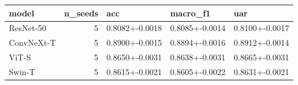 \begin{tabular}{lrlll}
\toprule
model & n_seeds & acc & macro_f1 & uar \\
\midrule
ResNet-50 & 5 & 0.8082+-0.0018 & 0.8085+-0.0014 & 0.8100+-0.0017 \\
ConvNeXt-T & 5 & 0.8900+-0.0015 & 0.8894+-0.0016 & 0.8912+-0.0014 \\
ViT-S & 5 & 0.8650+-0.0031 & 0.8638+-0.0031 & 0.8665+-0.0031 \\
Swin-T & 5 & 0.8615+-0.0021 & 0.8605+-0.0022 & 0.8631+-0.0021 \\
\bottomrule
\end{tabular}
